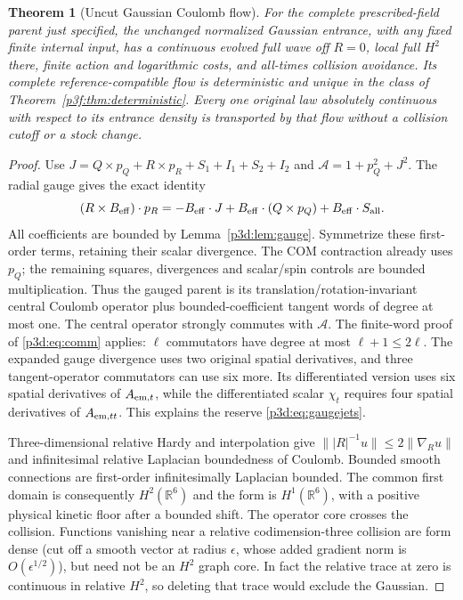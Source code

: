 \documentclass[11pt]{article}
\numberwithin{equation}{section}
\newtheorem{theorem}{Theorem}[section]
\theoremstyle{definition}
\theoremstyle{remark}
\begin{document}
\begin{theorem}[Uncut Gaussian Coulomb flow]\label{p3d:thm:CRG}
For the complete prescribed-field parent just specified, the unchanged
normalized Gaussian entrance, with any fixed finite internal input,
has a continuous evolved full wave off $R=0$, local full $H^2$ there,
finite action and logarithmic costs, and all-times collision avoidance.
Its complete reference-compatible flow is deterministic and unique
in the class of Theorem~\ref{p3f:thm:deterministic}. Every one original
law absolutely continuous with respect to its entrance density is
transported by that flow without a collision cutoff or a stock change.
\end{theorem}
\begin{proof}
Use
$J=Q\times p_Q+R\times p_R+S_1+I_1+S_2+I_2$
and $\mathcal A=1+p_Q^2+J^2$. The radial gauge gives the exact identity
\[
 (R\times B_{\rm eff})\cdot p_R
 =-B_{\rm eff}\cdot J+B_{\rm eff}\cdot(Q\times p_Q)
                                      +B_{\rm eff}\cdot S_{\rm all}.
\]
All coefficients are bounded by Lemma~\ref{p3d:lem:gauge}.
Symmetrize these first-order terms, retaining their scalar divergence.
The COM contraction already uses $p_Q$; the remaining squares,
divergences and scalar/spin controls are bounded multiplication.
Thus the gauged parent is its translation/rotation-invariant
central Coulomb operator plus bounded-coefficient tangent words of
degree at most one. The central operator strongly commutes with
$\mathcal A$. The finite-word proof of \eqref{p3d:eq:comm} applies:
$\ell$ commutators have degree at most $\ell+1\leq2\ell$.
The expanded gauge divergence uses two original spatial derivatives,
and three tangent-operator commutators can use six more. Its differentiated
version uses six spatial derivatives of $A_{{\rm em},t}$, while the
differentiated scalar $\chi_t$ requires four spatial derivatives of
$A_{{\rm em},tt}$. This explains the reserve
\eqref{p3d:eq:gaugejets}.

Three-dimensional relative Hardy and interpolation give
$\||R|^{-1}u\|\leq2\|\nabla_Ru\|$ and infinitesimal relative
Laplacian boundedness of Coulomb. Bounded smooth connections are
first-order infinitesimally Laplacian bounded. The common first
domain is consequently $H^2(\mathbb R^6)$ and the form is
$H^1(\mathbb R^6)$, with a positive physical kinetic floor after
a bounded shift. The operator core crosses the collision.
Functions vanishing near a relative codimension-three collision are
form dense (cut off a smooth vector at radius $\epsilon$, whose
added gradient norm is $O(\epsilon^{1/2})$), but need not be an
$H^2$ graph core. In fact the relative trace at zero is continuous
in relative $H^2$, so deleting that trace would exclude the Gaussian.


\end{proof}
\end{document}

